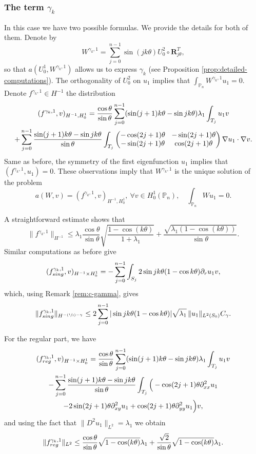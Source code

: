\documentclass[11pt]{article}
\numberwithin{equation}{section}\newtheorem*{jepEnonce}{\jepEnonceTitle}\newenvironment{enonce*}[1]{\def\jepEnonceTitle{#1}\jepEnonce}{\endjepEnonce}\newtheorem*{conj*}{Conjecture}
\newcommand{\Psfrac}[2]{(\sfrac{#1}{#2})}
\newcommand{\colsep}{\arraycolsep4.5pt}
\theoremstyle{plain}
\theoremstyle{definition}
\newcommand{\bo}[1]{{\boldsymbol#1}}
\newcommand{\reg}{\textup{reg}}
\newcommand{\sing}{\textup{sing}}
\def\Pp{{\mathbb{P}_n}}
\newcommand{\lb}{\lambda}
\let\jepOriginalSfrac\sfrac
\renewcommand{\sfrac}[2]{{\jepOriginalSfrac{#1}{#2}}}
\begin{document}
\subsubsection*{The term $\gamma_k$} In this case we have two possible formulas. We provide the details for both of them. Denote by
\[
W^{\gamma_k,1} = \sum_{j=0}^{n-1} \sin(jk\theta) U_0^2\circ \bo R_{j\theta}^T,
\]
so that $a(U_0^1,W^{\gamma_k,1})$ allows us to express $\gamma_k$ (see Proposition \ref{prop:detailed-computations}). The orthogonality of $U_0^2$ on $u_1$ implies that $\int_\Pp W^{\gamma_k,1}u_1=0$. Denote $f^{\gamma_k,1} \in H^{-1}$ the distribution
\vspace*{-5pt}
\begin{multline*}
(f^{\gamma_k,1},v)_{H^{-1},H_0^1}
= \frac{\cos\theta}{\sin\theta}\sum_{j=0}^{n-1} (\sin(j+1)k\theta-\sin jk\theta) \lambda_1\int_{T_j} u_1 v\\\colsep
+ \sum_{j=0}^{n-1} \frac{\sin(j+1)k\theta-\sin jk\theta}{\sin \theta} \int_{T_j}\begin{pmatrix}
-\cos (2j+1)\theta & -\sin (2j+1) \theta \\
-\sin(2j+1)\theta & \cos (2j+1)\theta
\end{pmatrix}\nabla u_1 \cdot \nabla v.
\end{multline*}
Same as before, the symmetry of the first eigenfunction $u_1$ implies that $(f^{\gamma_k,1},u_1) = 0$. These observations imply that $W^{\gamma_k,1}$ is the unique solution of the problem
\[
a(W,v) = (f^{\gamma_k,1},v)_{H^{-1},H_0^1},\ \forall v \in H_0^1(\Pp),\quad \int_\Pp Wu_1=0.
\]

A straightforward estimate shows that
\[
\|f^{\gamma_k,1}\|_{H^{-1}} \leq \lambda_1\frac{\cos\theta}{\sin \theta} \sqrt{\frac{1-\cos(k\theta)}{1+\lambda_1}} +\frac{\sqrt{\lambda_1(1-\cos(k\theta))}}{\sin \theta}.
\]
Similar computations as before give
\[
(f_{\sing}^{\gamma_k,1}, v)_{H^{-1}\times H^1_0} = - \sum_{j=0}^{n-1}\int_{S_j} 2 \sin jk\theta(1-\cos k \theta) \partial_r u_1 v,
\]
which, using Remark \ref{rem:c-gamma}, gives
\[
\|f_{\sing}^{\gamma_k,1}\|_{H^{-\Psfrac 12-\gamma}}\le 2\sum_{j=0}^{n-1} | \sin jk\theta(1-\cos k \theta)| \sqrt{\lb_1}\,\|u_1\|_{L^2(S_0)} C_\gamma.
\]

For the regular part, we have
\vspace*{-5pt}
\begin{multline*}
(f_{\reg}^{\gamma_k,1}, v)_{H^{-1}\times H^1_0}= \frac{\cos \theta}{\sin \theta}\sum_{j=0}^{n-1} (\sin (j+1)k\theta-\sin jk\theta) \lb_1 \int_{T_j} u_1v \\
- \sum_{j=0}^{n-1} \frac{\sin(j+1)k\theta-\sin jk\theta}{\sin \theta} \int_{T_j} \Big (-\cos (2j+1)\theta \partial^2_{xx}u_1 \\
-2 \sin (2j+1)\theta \partial^2_{xy} u_1
+ \cos(2j+1)\theta \partial^2_{yy} u_1\Big)v,
\end{multline*}
and using the fact that $\|D^2 u_1\|_{L^2} = \lambda_1$ we obtain
\[
\|f_{\reg}^{\gamma_k,1}\|_{L^2}\le \frac{\cos\theta}{\sin \theta}\sqrt{1-\cos (k \theta)} \lb_1 +\frac{\sqrt{2}}{\sin \theta} \sqrt{1- \cos (k \theta)}\lb_1 .
\]
\end{document}
